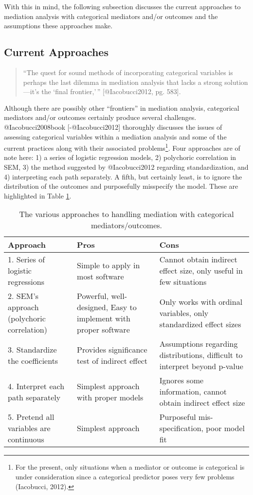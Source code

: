 \documentclass[]{article}
\let\rmarkdownfootnote\footnote%
\def\footnote{\protect\rmarkdownfootnote}
\begin{document}
With this in mind, the following subsection discusses the current
approaches to mediation analysis with categorical mediators and/or
outcomes and the assumptions these approaches make.

\subsection{Current Approaches}\label{current-approaches}

\begin{quote}
``The quest for sound methods of incorporating categorical variables is
perhaps the last dilemma in mediation analysis that lacks a strong
solution---it's the `final frontier,'\,'' {[}@Iacobucci2012, pg. 583{]}.
\end{quote}

Although there are possibly other ``frontiers'' in mediation analysis,
categorical mediators and/or outcomes certainly produce several
challenges. @Iacobucci2008book {[}-@Iacobucci2012{]} thoroughly
discusses the issues of assessing categorical variables within a
mediation analysis and some of the current practices along with their
associated
problems\footnote{For the present, only situations when a mediator or outcome is categorical is under consideration since a categorical predictor poses very few problems (Iacobucci, 2012).}.
Four approaches are of note here: 1) a series of logistic regression
models, 2) polychoric correlation in SEM, 3) the method suggested by
@Iacobucci2012 regarding standardization, and 4) interpreting each path
separately. A fifth, but certainly least, is to ignore the distribution
of the outcomes and purposefully misspecify the model. These are
highlighted in Table \ref{tab_approaches}.

\begin{table}[tb]
\centering
\caption{The various approaches to handling mediation with categorical mediators/outcomes.} 
\label{tab_approaches}
\begin{tabular}{p{40mm}p{45mm}p{55mm}}
\toprule
Approach & Pros & Cons \\ 
\midrule
1. Series of logistic regressions & Simple to apply in most software & Cannot obtain indirect effect size, only useful in few situations \\ 
2. SEM's approach (polychoric correlation) & Powerful, well-designed, Easy to implement with proper software & Only works with ordinal variables, only standardized effect sizes \\ 
3. Standardize the coefficients & Provides significance test of indirect effect & Assumptions regarding distributions, difficult to interpret beyond p-value \\ 
4. Interpret each path separately & Simplest approach with proper models & Ignores some information, cannot obtain indirect effect size \\ 
5. Pretend all variables are continuous & Simplest approach & Purposeful mis-specification, poor model fit \\ 
\bottomrule
\end{tabular}
\end{table}
\end{document}

